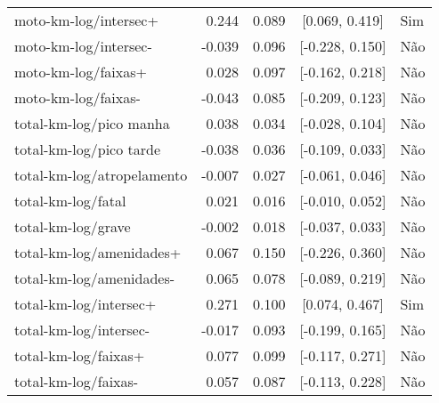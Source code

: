 \begin{longtable}{lrrcl}
moto-km-log/intersec+ & 0.244 & 0.089 & {}[0.069, 0.419] & Sim\\
moto-km-log/intersec- & -0.039 & 0.096 & {}[-0.228, 0.150] & Não\\
moto-km-log/faixas+ & 0.028 & 0.097 & {}[-0.162, 0.218] & Não\\
moto-km-log/faixas- & -0.043 & 0.085 & {}[-0.209, 0.123] & Não\\
total-km-log/pico manha & 0.038 & 0.034 & {}[-0.028, 0.104] & Não\\
total-km-log/pico tarde & -0.038 & 0.036 & {}[-0.109, 0.033] & Não\\
total-km-log/atropelamento & -0.007 & 0.027 & {}[-0.061, 0.046] & Não\\
total-km-log/fatal & 0.021 & 0.016 & {}[-0.010, 0.052] & Não\\
total-km-log/grave & -0.002 & 0.018 & {}[-0.037, 0.033] & Não\\
total-km-log/amenidades+ & 0.067 & 0.150 & {}[-0.226, 0.360] & Não\\
total-km-log/amenidades- & 0.065 & 0.078 & {}[-0.089, 0.219] & Não\\
total-km-log/intersec+ & 0.271 & 0.100 & {}[0.074, 0.467] & Sim\\
total-km-log/intersec- & -0.017 & 0.093 & {}[-0.199, 0.165] & Não\\
total-km-log/faixas+ & 0.077 & 0.099 & {}[-0.117, 0.271] & Não\\
total-km-log/faixas- & 0.057 & 0.087 & {}[-0.113, 0.228] & Não\\*
\end{longtable}
